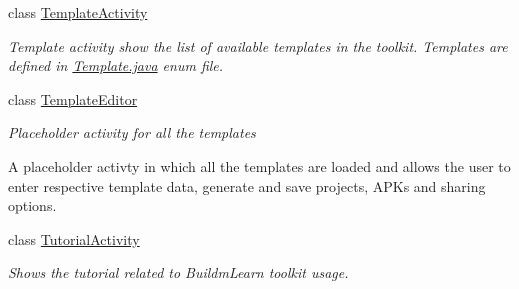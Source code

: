 \begin{DoxyCompactItemize}
class \hyperlink{classorg_1_1buildmlearn_1_1toolkit_1_1activity_1_1TemplateActivity}{Template\+Activity}
\begin{DoxyCompactList}\small\item\em Template activity show the list of available templates in the toolkit. Templates are defined in \hyperlink{Template_8java}{Template.\+java} enum file. \end{DoxyCompactList}\item 
class \hyperlink{classorg_1_1buildmlearn_1_1toolkit_1_1activity_1_1TemplateEditor}{Template\+Editor}
\begin{DoxyCompactList}\small\item\em Placeholder activity for all the templates 

A placeholder activty in which all the templates are loaded and allows the user to enter respective template data, generate and save projects, A\+P\+Ks and sharing options. \end{DoxyCompactList}\item 
class \hyperlink{classorg_1_1buildmlearn_1_1toolkit_1_1activity_1_1TutorialActivity}{Tutorial\+Activity}
\begin{DoxyCompactList}\small\item\em Shows the tutorial related to Buildm\+Learn toolkit usage. \end{DoxyCompactList}\end{DoxyCompactItemize}
